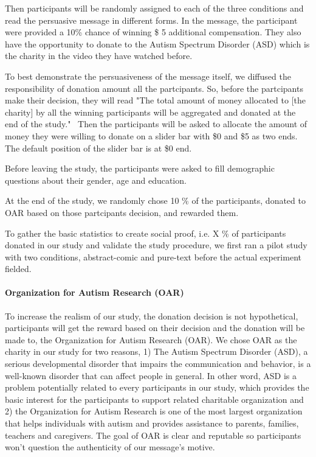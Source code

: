 Then participants will be randomly assigned to each of the three conditions and read the persuasive message in different forms. In the message, the participant were provided a 10\% chance of winning \$ 5 additional compensation. They also have the opportunity to donate to the Autism Spectrum Disorder (ASD) which is the charity in the video they have watched before.

To best demonstrate the persuasiveness of the message itself, we diffused the responsibility of donation amount all the partcipants. So, before the partcipants make their decision, they will read "The total amount of money allocated to [the charity] by all the winning participants will be aggregated and donated at the end of the study."~\cite{} Then the participants will be asked to allocate the amount of money they were willing to donate on a slider bar with \$0 and \$5 as two ends. The default position of the slider bar is at \$0 end.

Before leaving the study, the participants were asked to fill demographic questions about their gender, age and education.

At the end of the study, we randomly chose 10 \% of the participants, donated to OAR based on those partcipants decision, and rewarded them.

To gather the basic statistics to create social proof, i.e.  X \% of participants donated in our study and validate the study procedure, we first ran a pilot study with two conditions, abstract-comic and pure-text before the actual experiment fielded.

\paragraph{Organization for Autism Research (OAR)}
To increase the realism of our study, the donation decision is not hypothetical, participants will get the reward based on their decision and the donation will be made to, the Organization for Autism Research (OAR). We chose OAR as the charity in our study for two reasons, 1) The Autism Spectrum Disorder (ASD), a serious developmental disorder that impairs the communication and behavior, is a well-known disorder that can affect people in general. In other word, ASD is a problem potentially related to every participants in our study, which provides the basic interest for the participants to support related charitable organization and 2) the Organization for Autism Research is one of the most largest organization that helps individuals with autism and provides assistance to parents, families, teachers and caregivers. The goal of OAR is clear and reputable so participants won't question the authenticity of our message's motive.

